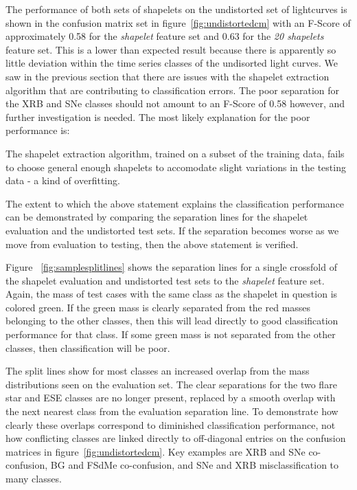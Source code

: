 The performance of both sets of shapelets on the undistorted set of lightcurves is shown in the confusion matrix set in figure~\ref{fig:undistortedcm} with an F-Score of approximately 0.58 for the \emph{shapelet} feature set and 0.63 for the \emph{20 shapelets} feature set. This is a lower than expected result because there is apparently so little deviation within the time series classes of the undisorted light curves. We saw in the previous section that there are issues with the shapelet extraction algorithm that are contributing to classification errors. The poor separation for the XRB and SNe classes should not amount to an F-Score of 0.58 however, and further investigation is needed. The most likely explanation for the poor performance is:
\begin{center}
	The shapelet extraction algorithm, trained on a subset of the training data, fails to choose general enough shapelets to accomodate slight variations in the testing data - a kind of overfitting.
\end{center}
The extent to which the above statement explains the classification performance can be demonstrated by comparing the separation lines for the shapelet evaluation and the undistorted test sets. If the separation becomes worse as we move from evaluation to testing, then the above statement is verified. 

Figure ~\ref{fig:samplesplitlines} shows the separation lines for a single crossfold of the shapelet evaluation and undistorted test sets to the \emph{shapelet} feature set. Again, the mass of test cases with the same class as the shapelet in question is colored green. If the green mass is clearly separated from the red masses belonging to the other classes, then this will lead directly to good classification performance for that class. If some green mass is not separated from the other classes, then classification will be poor.


The split lines show for most classes an increased overlap from the mass distributions seen on the evaluation set. The clear separations for the two flare star and ESE classes are no longer present, replaced by a smooth overlap with the next nearest class from the evaluation separation line. To demonstrate how clearly these overlaps correspond to diminished classification performance, not how conflicting classes are linked directly to off-diagonal entries on the confusion matrices in figure~\ref{fig:undistortedcm}. Key examples are XRB and SNe co-confusion, BG and FSdMe co-confusion, and SNe and XRB misclassification to many classes.

